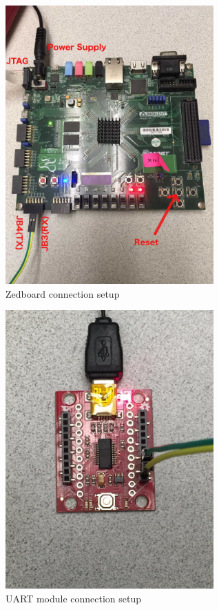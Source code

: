 \documentclass{article}
\theoremstyle{definition}
\begin{document}
\begin{figure}[h]
\caption{Zedboard connection setup}
\label{FPGA}
\includegraphics[width=8cm]{./fig/FPGA.jpg}
\centering
\end{figure}

\begin{figure}[h]
\caption{UART module connection setup}
\label{uart}
\includegraphics[width=8cm]{./fig/UART.jpg}
\centering
\end{figure}

\clearpage
\end{document}
